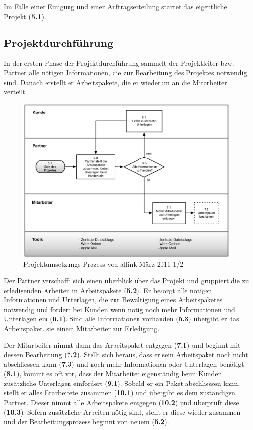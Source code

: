 Im Falle einer Einigung und einer Auftragserteilung startet das eigentliche
Projekt (\textbf{5.1}).

\clearpage

\subsection{Projektdurchführung}
In der ersten Phase der Projektdurchführung sammelt der Projektleiter bzw.
Partner alle nötigen Informationen, die zur Bearbeitung des Projektes notwendig sind.
Danach erstellt er Arbeitspakete, die er wiederum an die Mitarbeiter verteilt.

\begin{figure}[htbp]
\begin{center}
\includegraphics[width=0.99\textwidth,angle=0]{./bilder/analyse/02_ist_prozesse_arbeit_01.pdf}
\caption{Projektumsetzungs Prozess von allink März 2011 1/2}
\label{pic:02_ist_prozesse_arbeit_01}
\end{center}
\end{figure}

Der Partner verschafft sich einen überblick über das Projekt und gruppiert
die zu erledigenden Arbeiten in Arbeitspakete (\textbf{5.2}). Er besorgt alle nötigen Informationen
und Unterlagen, die zur Bewältigung eines Arbeitspaketes notwendig und fordert
bei Kunden wenn nötig noch mehr Informationen und Unterlagen ein (\textbf{6.1}).
Sind alle Informationen vorhanden (\textbf{5.3}) übergibt er das Arbeitspaket.
sie einem Mitarbeiter zur Erledigung.

Der Mitarbeiter nimmt dann das Arbeitspaket entgegen (\textbf{7.1}) und beginnt
mit dessen Bearbeitung (\textbf{7.2}). Stellt sich heraus, dass er sein Arbeitspaket
noch nicht abschliessen kann (\textbf{7.3}) und noch mehr Informationen oder
Unterlagen benötigt (\textbf{8.1}), kommt es oft vor, dass der Mitarbeiter
eigenständig beim Kunden zusätzliche Unterlagen einfordert (\textbf{9.1}).
Sobald er ein Paket abschliessen kann, stellt er alles Erarbeitete zusammen (\textbf{10.1})
und übergibt es dem zuständigen Partner.
Dieser nimmt alle Arbeitspakete entgegen (\textbf{10.2})
und überprüft diese (\textbf{10.3}). Sofern zusätzliche Arbeiten nötig sind,
stellt er diese wieder zusammen und der Bearbeitungsprozess beginnt von neuem (\textbf{5.2}).

